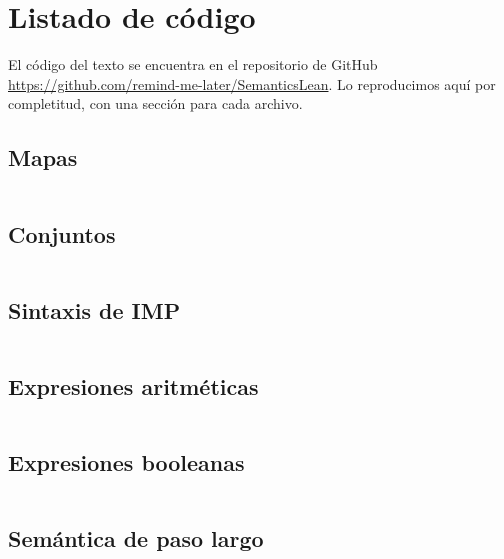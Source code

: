 \documentclass[
  a4paper, 
  10pt, 
  parskip=half, 
  toc=bibliography,
]{scrbook}
\theoremstyle{definition}
\theoremstyle{bolddef}
\begin{document}





\appendix


\chapter{Listado de código}

El código del texto se encuentra en el repositorio de GitHub
\url{https://github.com/remind-me-later/SemanticsLean}. 
Lo reproducimos aquí por completitud, con una sección para cada
archivo.

\section{Mapas}

\inputminted{lean4}{../SemanticsLean/Semantics/Maps.lean}

\section{Conjuntos}

\inputminted{lean4}{../SemanticsLean/Semantics/Set.lean}

\section{Sintaxis de IMP}

\inputminted{lean4}{../SemanticsLean/Semantics/Imp/Lang.lean}

\section{Expresiones aritméticas}

\inputminted{lean4}{../SemanticsLean/Semantics/Imp/Aexp.lean}

\section{Expresiones booleanas}

\inputminted{lean4}{../SemanticsLean/Semantics/Imp/Bexp.lean}

\section{Semántica de paso largo}
\end{document}
